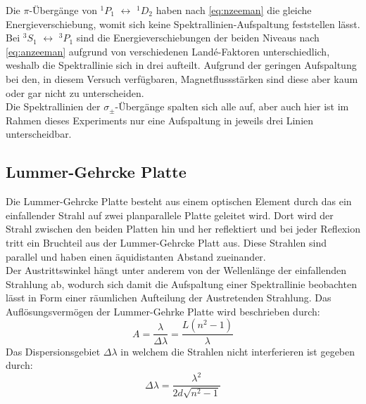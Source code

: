 Die $\pi$-Übergänge von $^1P_1$ $\leftrightarrow$ $^1D_2$ haben nach \autoref{eq:nzeeman} die gleiche Energieverschiebung, womit sich keine Spektrallinien-Aufspaltung feststellen lässt.
Bei $^3S_1$ $\leftrightarrow$ $^3P_1$ sind die Energieverschiebungen der beiden Niveaus nach \autoref{eq:anzeeman} aufgrund von verschiedenen Landé-Faktoren unterschiedlich, weshalb die Spektrallinie sich in drei aufteilt. Aufgrund der geringen Aufspaltung bei den, in diesem Versuch verfügbaren, Magnetflussstärken sind diese aber kaum oder gar nicht zu unterscheiden.\\
Die Spektrallinien der $\sigma_\pm$-Übergänge spalten sich alle auf, aber auch hier ist im Rahmen dieses Experiments nur eine Aufspaltung in jeweils drei Linien unterscheidbar.



\subsection{Lummer-Gehrcke Platte}
\label{sec:lgplatte}

Die Lummer-Gehrcke Platte besteht aus einem optischen Element durch das ein einfallender Strahl auf zwei planparallele Platte geleitet wird. Dort wird der Strahl zwischen den beiden Platten hin und her reflektiert und bei jeder Reflexion tritt ein Bruchteil aus der Lummer-Gehrcke Platt aus. Diese Strahlen sind parallel und haben einen äquidistanten Abstand zueinander.\\
Der Austrittswinkel hängt unter anderem von der Wellenlänge der einfallenden Strahlung ab, wodurch sich damit die Aufspaltung einer Spektrallinie beobachten lässt in Form einer räumlichen Aufteilung der Austretenden Strahlung.
Das Auflösungsvermögen der Lummer-Gehrke Platte wird beschrieben durch:
\begin{equation}
    \label{eq:aufloesungsvermoegen}
    A=\frac{\lambda}{\Delta\lambda}=\frac{L(n^2-1)}{\lambda}
\end{equation}
Das Dispersionsgebiet $\Delta\lambda$ in welchem die Strahlen nicht interferieren ist gegeben durch:
\begin{equation}
    \label{eq:dispersionsgebiet}
    \Delta\lambda=\frac{\lambda^2}{2d\sqrt{n^2-1}}
\end{equation}
























